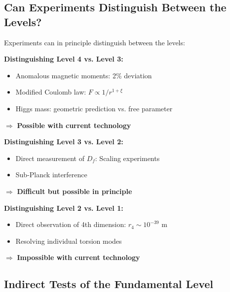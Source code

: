 	\subsection{Can Experiments Distinguish Between the Levels?}
	
	\begin{important}
		Experiments can in principle distinguish between the levels:
		
		\vspace{0.3cm}
		
		\textbf{Distinguishing Level 4 vs. Level 3:}
		\begin{itemize}
			\item Anomalous magnetic moments: 2\% deviation
			\item Modified Coulomb law: $F \propto 1/r^{1+\xi}$
			\item Higgs mass: geometric prediction vs. free parameter
		\end{itemize}
		
		$\Rightarrow$ \textbf{Possible with current technology}
		
		\vspace{0.3cm}
		
		\textbf{Distinguishing Level 3 vs. Level 2:}
		\begin{itemize}
			\item Direct measurement of $D_f$: Scaling experiments
			\item Sub-Planck interference
		\end{itemize}
		
		$\Rightarrow$ \textbf{Difficult but possible in principle}
		
		\vspace{0.3cm}
		
		\textbf{Distinguishing Level 2 vs. Level 1:}
		\begin{itemize}
			\item Direct observation of 4th dimension: $r_4 \sim 10^{-39}$ m
			\item Resolving individual torsion modes
		\end{itemize}
		
		$\Rightarrow$ \textbf{Impossible with current technology}
	\end{important}
	
	\subsection{Indirect Tests of the Fundamental Level}
	

